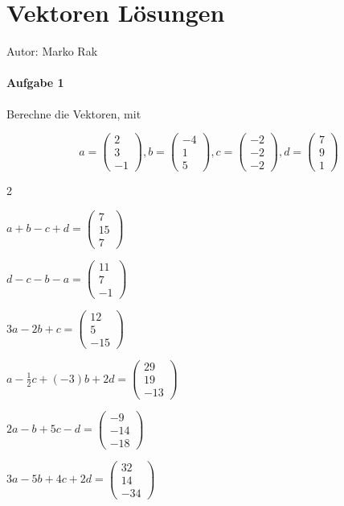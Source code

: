 \def\vect#1,#2{\left(\!\!\!\begin{array}{c}#1\\#2\end{array}\!\!\!\right)}
\newcommand{\mvect}[1]{\left(\!\!\!\begin{array}{c}#1%
\end{array}\!\!\!\right)}

\chapter{Vektoren L\"osungen}

	Autor: Marko Rak
	
	\subsubsection{Aufgabe 1}
		
		Berechne die Vektoren, mit
		
		\[
			a = \mvect{2\\3\\-1},
			b= \mvect{-4\\1\\5},
			c = \mvect{-2\\-2\\-2},
			d = \mvect{7\\9\\1}
		\]
		
			\begin{enumerate}[a)]
			\end{enumerate}
		
